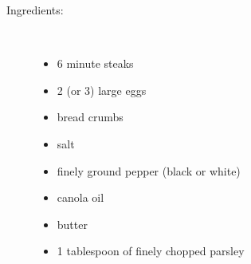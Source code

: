 \documentclass[11pt,letterpaper]{article}
\begin{document}
\begin{description}

\item[Ingredients:]\ \\
	\begin{itemize}
	\item 6 minute steaks
	\item 2 (or 3) large eggs
	\item bread crumbs
	\item salt
	\item finely ground pepper (black or white)
	\item canola oil
	\item butter
	\item 1 tablespoon of finely chopped parsley
	\end{itemize}


\end{description}
\end{document}
